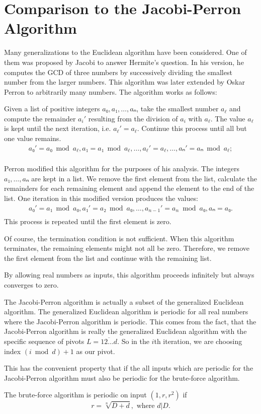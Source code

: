 \section{Comparison to the Jacobi-Perron Algorithm}

Many generalizations to the Euclidean algorithm have been considered.
One of them was proposed by Jacobi to answer Hermite's question.
In his version, he computes the GCD of three numbers by successively dividing
the smallest number from the larger numbers.
This algorithm was later extended by Oskar Perron to arbitrarily many numbers.
The algorithm works as follows:

Given a list of positive integers $a₀, a₁, …, aₙ$, take the smallest number $a_ℓ$
and compute the remainder $a_i'$ resulting from the division of $a_i$ with $a_ℓ$.
The value $a_ℓ$ is kept until the next iteration, i.e. $a_ℓ' = a_ℓ$.
Continue this process until all but one value remains.
\begin{align*}
  a₀' = a₀ \bmod a_ℓ, a₁ = a₁ \bmod a_ℓ, …, a_ℓ' = a_ℓ, …, aₙ' = aₙ \bmod a_ℓ; \\
\end{align*}

Perron modified this algorithm for the purposes of his analysis.
The integers $a₁, …, aₙ$ are kept in a list.
We remove the first element from the list, calculate the remainders for each
remaining element and append the element to the end of the list.
One iteration in this modified version produces the values:
\begin{align*}
  a₀' = a₁ \bmod a₀, a₁' = a₂ \bmod a₀, …, a_{n-1}' = a_n \bmod a₀, aₙ = a₀. \\
\end{align*}
This process is repeated until the first element is zero.

Of course, the termination condition is not sufficient.
When this algorithm terminates, the remaining elements might not all be zero.
Therefore, we remove the first element from the list and continue with the
remaining list.

By allowing real numbers as inputs, this algorithm proceeds infinitely but
always converges to zero.

The Jacobi-Perron algorithm is actually a subset of the generalized Euclidean algorithm.
The generalized Euclidean algorithm is periodic for all real numbers where the Jacobi-Perron algorithm is periodic.
This comes from the fact, that the Jacobi-Perron algorithm is really the
generalized Euclidean algorithm with the specific sequence of pivots $L = \overline{12…d}$.
So in the $i$th iteration, we are choosing index $(i \bmod d) + 1$ as our pivot.

This has the convenient property that if the all inputs which are periodic for
the Jacobi-Perron algorithm must also be periodic for the brute-force algorithm.

\begin{theorem}
  The brute-force algorithm is periodic on input $(1, r, r^2)$ if
  \[
    r = \sqrt[n]{D + d}, \text{ where } d | D.
  \]
\end{theorem}

